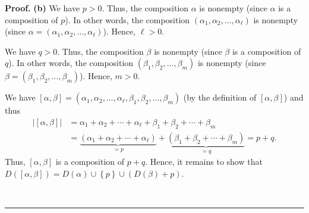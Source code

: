 \documentclass
[numbers=enddot,12pt,final,onecolumn,notitlepage,abstracton]{scrartcl}%
\theoremstyle{definition}
\newenvironment{proof}[1][Proof]{\noindent\textbf{#1.} }{\ \rule{0.5em}{0.5em}}
\newenvironment{verlong}{}{}
\begin{document}
\begin{verlong}
\begin{proof}
\textbf{(b)} We have $p > 0$. Thus, the composition $\alpha$ is nonempty
(since $\alpha$ is a composition of $p$). In other words, the composition
$\left(  \alpha_{1}, \alpha_{2}, \ldots, \alpha_{\ell}\right)  $ is nonempty
(since $\alpha= \left(  \alpha_{1}, \alpha_{2}, \ldots, \alpha_{\ell}\right)
$). Hence, $\ell> 0$.

We have $q > 0$. Thus, the composition $\beta$ is nonempty (since $\beta$ is a
composition of $q$). In other words, the composition $\left(  \beta_{1},
\beta_{2}, \ldots, \beta_{m}\right)  $ is nonempty (since $\beta= \left(
\beta_{1}, \beta_{2}, \ldots, \beta_{m}\right)  $). Hence, $m > 0$.

We have $\left[  \alpha,\beta\right]  =\left(  \alpha_{1},\alpha_{2}%
,\ldots,\alpha_{\ell},\beta_{1},\beta_{2},\ldots,\beta_{m}\right)  $ (by the
definition of $\left[  \alpha,\beta\right]  $) and thus%
\begin{align*}
\left\vert \left[  \alpha,\beta\right]  \right\vert  &  =\alpha_{1}+\alpha
_{2}+\cdots+\alpha_{\ell}+\beta_{1}+\beta_{2}+\cdots+\beta_{m}\\
&  =\underbrace{\left(  \alpha_{1}+\alpha_{2}+\cdots+\alpha_{\ell}\right)
}_{=p}+\underbrace{\left(  \beta_{1}+\beta_{2}+\cdots+\beta_{m}\right)  }%
_{=q}=p+q.
\end{align*}
Thus, $\left[  \alpha,\beta\right]  $ is a composition of $p+q$. Hence, it
remains to show that $D\left(  \left[  \alpha,\beta\right]  \right)  =D\left(
\alpha\right)  \cup\left\{  p\right\}  \cup\left(  D\left(  \beta\right)
+p\right)  $.


\end{proof}
\end{verlong}
\end{document}
